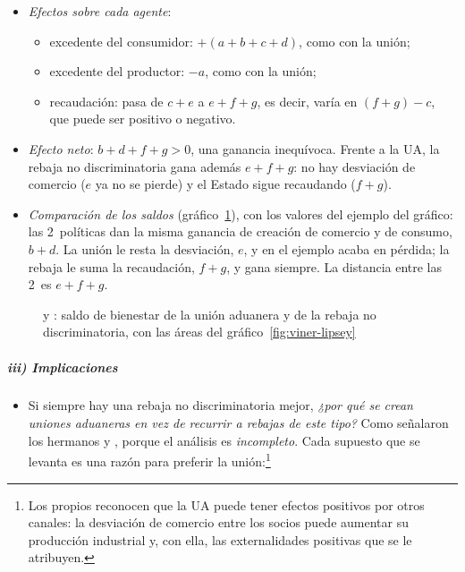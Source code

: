 \documentclass[11pt]{article}
\begin{document}
\begin{itemize}
\item \emph{Efectos sobre cada agente}:
  \begin{itemize}
  \item excedente del consumidor: $+(a+b+c+d)$, como con la unión;
  \item excedente del productor: $-a$, como con la unión;
  \item recaudación: pasa de $c+e$ a $e+f+g$, es decir, varía en $(f+g)-c$, que puede ser positivo o negativo.
  \end{itemize}
\item \emph{Efecto neto}: $b+d+f+g>0$, una ganancia inequívoca. Frente a la UA, la rebaja no discriminatoria gana además $e+f+g$: no hay desviación de comercio ($e$ ya no se pierde) y el Estado sigue recaudando ($f+g$).
\item \emph{Comparación de los saldos} (gráfico~\ref{fig:cooper-massell-saldo}), con los valores del ejemplo del gráfico: las 2~políticas dan la misma ganancia de creación de comercio y de consumo, $b+d$. La unión le resta la desviación, $e$, y en el ejemplo acaba en pérdida; la rebaja le suma la recaudación, $f+g$, y gana siempre. La distancia entre las 2~es $e+f+g$.
\end{itemize}

\begin{figure}[H]
\centering
\caption{ y : saldo de bienestar de la unión aduanera y de la rebaja no discriminatoria, con las áreas del gráfico~\ref{fig:viner-lipsey}}\label{fig:cooper-massell-saldo}
\end{figure}

\subparagraph{iii) Implicaciones}

\begin{itemize}
\item Si siempre hay una rebaja no discriminatoria mejor, \emph{¿por qué se crean uniones aduaneras en vez de recurrir a rebajas de este tipo?} Como señalaron los hermanos  y  \parencite*{WonnacottWonnacott1981}, porque el análisis es \emph{incompleto}. Cada supuesto que se levanta es una razón para preferir la unión:\footnote{Los propios \textcite{CooperMassell1965Toward} reconocen que la UA puede tener efectos positivos por otros canales: la desviación de comercio entre los socios puede aumentar su producción industrial y, con ella, las externalidades positivas que se le atribuyen.}
\end{itemize}
\end{document}
